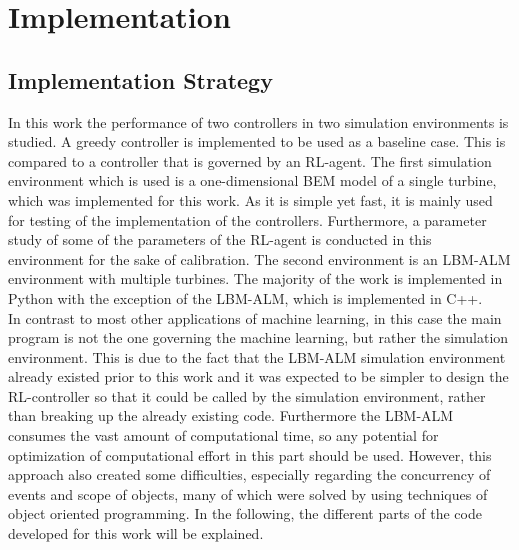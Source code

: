 \section{Implementation}
\subsection{Implementation Strategy}
In this work the performance of two controllers in two simulation environments is studied. A greedy controller is implemented to be used as a baseline case. This is compared to a controller that is governed by an RL-agent. The first simulation environment which is used is a one-dimensional BEM model of a single turbine, which was implemented for this work. As it is simple yet fast, it is mainly used for testing of the implementation of the controllers. Furthermore, a parameter study of some of the parameters of the RL-agent is conducted in this environment for the sake of calibration. The second environment is an LBM-ALM environment with multiple turbines. The majority of the work is implemented in Python with the exception of the LBM-ALM, which is implemented in C++.\\
In contrast to most other applications of machine learning, in this case the main program is not the one governing the machine learning, but rather the simulation environment. This is due to the fact that the LBM-ALM simulation environment already existed prior to this work and it was expected to be simpler to design the RL-controller so that it could be called by the simulation environment, rather than breaking up the already existing code. Furthermore the LBM-ALM consumes the vast amount of computational time, so any potential for optimization of computational effort in this part should be used. However, this approach also created some difficulties, especially regarding the concurrency of events and scope of objects, many of which were solved by using techniques of object oriented programming. In the following, the different parts of the code developed for this work will be explained.
